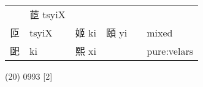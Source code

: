 \documentclass[14pt,a4paper]{scrartcl}
\begin{document}
\begin{longtable}[c]{@{}llllll@{}}
\begin{minipage}[t]{0.14\columnwidth}
\strut\end{minipage} &
\begin{minipage}[t]{0.14\columnwidth}\raggedright\strut
茝 tsyiX
\strut\end{minipage} &
\begin{minipage}[t]{0.14\columnwidth}\raggedright\strut
\strut\end{minipage}\tabularnewline
\begin{minipage}[t]{0.14\columnwidth}\raggedright\strut
𦣝
\strut\end{minipage} &
\begin{minipage}[t]{0.14\columnwidth}\raggedright\strut
tsyiX
\strut\end{minipage} &
\begin{minipage}[t]{0.14\columnwidth}\raggedright\strut
姬 ki
\strut\end{minipage} &
\begin{minipage}[t]{0.14\columnwidth}\raggedright\strut
頤 yi
\strut\end{minipage} &
\begin{minipage}[t]{0.14\columnwidth}\raggedright\strut
\strut\end{minipage} &
\begin{minipage}[t]{0.14\columnwidth}\raggedright\strut
mixed
\strut\end{minipage}\tabularnewline
\begin{minipage}[t]{0.14\columnwidth}\raggedright\strut
巸
\strut\end{minipage} &
\begin{minipage}[t]{0.14\columnwidth}\raggedright\strut
ki
\strut\end{minipage} &
\begin{minipage}[t]{0.14\columnwidth}\raggedright\strut
熙 xi
\strut\end{minipage} &
\begin{minipage}[t]{0.14\columnwidth}\raggedright\strut
\strut\end{minipage} &
\begin{minipage}[t]{0.14\columnwidth}\raggedright\strut
\strut\end{minipage} &
\begin{minipage}[t]{0.14\columnwidth}\raggedright\strut
pure:velars
\strut\end{minipage}\tabularnewline
\bottomrule
\end{longtable}

(20) 0993 {[}2{]}
\end{document}
